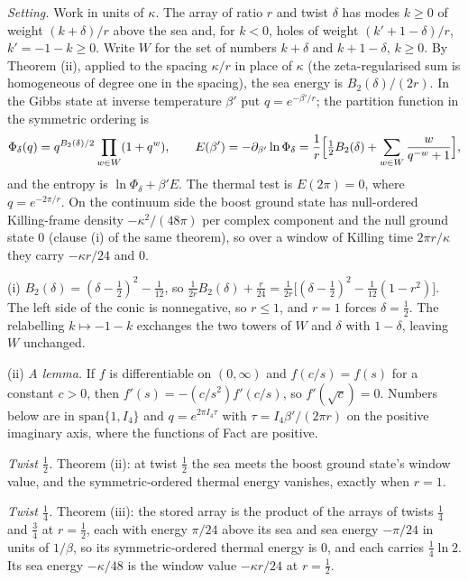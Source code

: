 \emph{Setting.} Work in units of $\kappa$. The array of ratio $r$ and twist $\delta$ has modes $k \ge 0$ of weight $(k + \delta)/r$ above the sea and, for $k < 0$, holes of weight $(k' + 1 - \delta)/r$, $k' = -1 - k \ge 0$. Write $W$ for the set of numbers $k + \delta$ and $k + 1 - \delta$, $k \ge 0$. By Theorem (ii), applied to the spacing $\kappa/r$ in place of $\kappa$ (the zeta-regularised sum is homogeneous of degree one in the spacing), the sea energy is $B_{2}(\delta)/(2r)$. In the Gibbs state at inverse temperature $\beta'$ put $q = e^{-\beta'/r}$; the partition function in the symmetric ordering is
\[
\Phi_{\delta}(q) = q^{B_{2}(\delta)/2}\prod_{w \in W}(1 + q^{w}), \qquad E(\beta') = -\partial_{\beta'}\ln\Phi_{\delta} = \frac{1}{r}\Bigl[\tfrac12 B_{2}(\delta) + \sum_{w \in W}\frac{w}{q^{-w} + 1}\Bigr],
\]
and the entropy is $\ln\Phi_{\delta} + \beta' E$. The thermal test is $E(2\pi) = 0$, where $q = e^{-2\pi/r}$. On the continuum side the boost ground state has null-ordered Killing-frame density $-\kappa^{2}/(48\pi)$ per complex component and the null ground state $0$ (clause (i) of the same theorem), so over a window of Killing time $2\pi r/\kappa$ they carry $-\kappa r/24$ and $0$.

(i) $B_{2}(\delta) = (\delta - \tfrac12)^{2} - \tfrac{1}{12}$, so $\tfrac{1}{2r}B_{2}(\delta) + \tfrac{r}{24} = \tfrac{1}{2r}\bigl[(\delta - \tfrac12)^{2} - \tfrac{1}{12}(1 - r^{2})\bigr]$. The left side of the conic is nonnegative, so $r \le 1$, and $r = 1$ forces $\delta = \tfrac12$. The relabelling $k \mapsto -1 - k$ exchanges the two towers of $W$ and $\delta$ with $1 - \delta$, leaving $W$ unchanged.

(ii) \emph{A lemma.} If $f$ is differentiable on $(0, \infty)$ and $f(c/s) = f(s)$ for a constant $c > 0$, then $f'(s) = -(c/s^{2})f'(c/s)$, so $f'(\sqrt{c}) = 0$. Numbers below are in $\mathrm{span}\{1, I_{4}\}$ and $q = e^{2\pi I_{4}\tau}$ with $\tau = I_{4}\beta'/(2\pi r)$ on the positive imaginary axis, where the functions of Fact  are positive.

\emph{Twist $\tfrac12$.} Theorem (ii): at twist $\tfrac12$ the sea meets the boost ground state's window value, and the symmetric-ordered thermal energy vanishes, exactly when $r = 1$.

\emph{Twist $\tfrac14$.} Theorem (iii): the stored array is the product of the arrays of twists $\tfrac14$ and $\tfrac34$ at $r = \tfrac12$, each with energy $\pi/24$ above its sea and sea energy $-\pi/24$ in units of $1/\beta$, so its symmetric-ordered thermal energy is $0$, and each carries $\tfrac14\ln 2$. Its sea energy $-\kappa/48$ is the window value $-\kappa r/24$ at $r = \tfrac12$.

